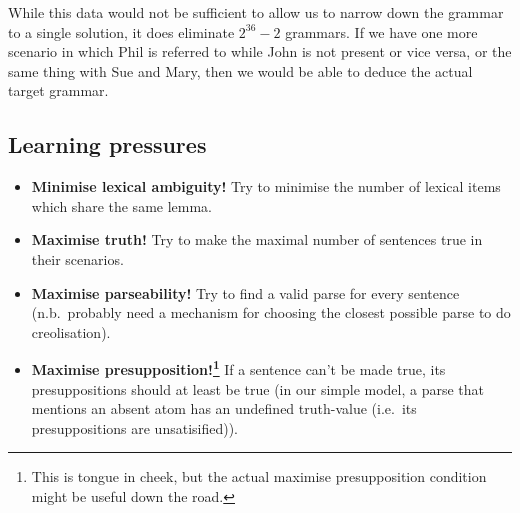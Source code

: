 \documentclass[11pt, a4paper]{article}
\begin{document}
While this data would not be sufficient to allow us to narrow down the grammar to a single solution, it does eliminate $2^36-2$ grammars. 
If we have one more scenario in which Phil is referred to while John is not present or vice versa, or the same thing with Sue and Mary, then we would be able to deduce the actual target grammar.

\subsection{Learning pressures}
\begin{itemize}
  \item \textbf{Minimise lexical ambiguity!} Try to minimise the number of lexical items which share the same lemma.
  \item \textbf{Maximise truth!} Try to make the maximal number of sentences true in their scenarios.
  \item \textbf{Maximise parseability!} Try to find a valid parse for every sentence (n.b.\ probably need a mechanism for choosing the closest possible parse to do creolisation).
  \item \textbf{Maximise presupposition!\footnote{This is tongue in cheek, but the actual maximise presupposition condition might be useful down the road.}} If a sentence can't be made true, its presuppositions should at least be true (in our simple model, a parse that mentions an absent atom has an undefined truth-value (i.e.\ its presuppositions are unsatisified)).
\end{itemize}






\printbibliography
\end{document}
